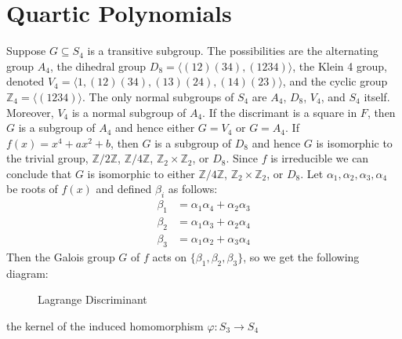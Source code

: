 \section{Quartic Polynomials}
    Suppose $G\subseteq{S}_{4}$ is a transitive subgroup. The possibilities
    are the alternating group $A_{4}$, the dihedral group
    $D_{8}=\langle(12)(34),(1234)\rangle$, the Klein 4 group, denoted
    $V_{4}=\langle{1},(12)(34),(13)(24),(14)(23)\rangle$, and the cyclic
    group $\mathbb{Z}_{4}=\langle{(1234)}\rangle$. The only normal subgroups
    of $S_{4}$ are $A_{4}$, $D_{8}$, $V_{4}$, and $S_{4}$ itself. Moreover,
    $V_{4}$ is a normal subgroup of $A_{4}$. If the discrimant is a square
    in $F$, then $G$ is a subgroup of $A_{4}$ and hence either $G=V_{4}$ or
    $G=A_{4}$. If $f(x)=x^{4}+ax^{2}+b$, then $G$ is a subgroup of $D_{8}$
    and hence $G$ is isomorphic to the trivial group,
    $\mathbb{Z}/2\mathbb{Z}$, $\mathbb{Z}/4\mathbb{Z}$,
    $\mathbb{Z}_{2}\times\mathbb{Z}_{2}$, or $D_{8}$. Since $f$ is
    irreducible we can conclude that $G$ is isomorphic to either
    $\mathbb{Z}/4\mathbb{Z}$, $\mathbb{Z}_{2}\times\mathbb{Z}_{2}$, or
    $D_{8}$. Let $\alpha_{1},\alpha_{2},\alpha_{3},\alpha_{4}$ be roots of
    $f(x)$ and defined $\beta_{i}$ as follows:
    \begin{subequations}
        \begin{align}
            \beta_{1}&=\alpha_{1}\alpha_{4}+\alpha_{2}\alpha_{3}\\
            \beta_{2}&=\alpha_{1}\alpha_{3}+\alpha_{2}\alpha_{4}\\
            \beta_{3}&=\alpha_{1}\alpha_{2}+\alpha_{3}\alpha_{4}
        \end{align}
    \end{subequations}
    Then the Galois group $G$ of $f$ acts on
    $\{\beta_{1},\beta_{2},\beta_{3}\}$, so we get the following diagram:
    \begin{figure}[H]
        \centering
        \captionsetup{type=figure}
        \caption{Lagrange Discriminant}
    \end{figure}
    the kernel of the induced homomorphism $\varphi:S_{3}\rightarrow{S}_{4}$
